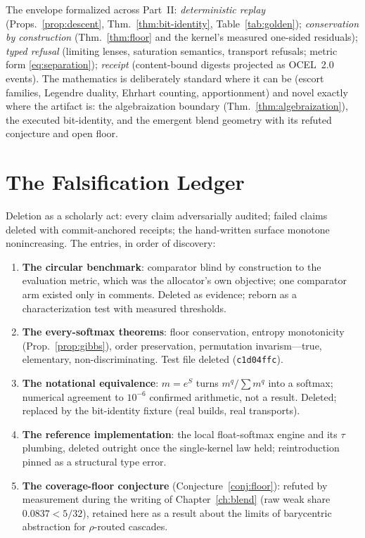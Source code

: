 \documentclass[12pt,oneside]{report}
\theoremstyle{plain}
\theoremstyle{definition}
\theoremstyle{remark}
\newcommand{\commit}[1]{\texttt{#1}}
\begin{document}
The envelope formalized across Part~II: \emph{deterministic replay}
(Props.~\ref{prop:descent}, Thm.~\ref{thm:bit-identity},
Table~\ref{tab:golden}); \emph{conservation by construction}
(Thm.~\ref{thm:floor} and the kernel's measured one-sided residuals);
\emph{typed refusal} (limiting lenses, saturation semantics, transport
refusals; metric form \eqref{eq:separation}); \emph{receipt}
(content-bound digests projected as OCEL~2.0 events). The mathematics
is deliberately standard where it can be (escort families, Legendre
duality, Ehrhart counting, apportionment) and novel exactly where the
artifact is: the algebraization boundary
(Thm.~\ref{thm:algebraization}), the executed bit-identity, and the
emergent blend geometry with its refuted conjecture and open floor.

\chapter{The Falsification Ledger}
\label{ch:ledger}

Deletion as a scholarly act: every claim adversarially audited; failed
claims deleted with commit-anchored receipts; the hand-written surface
monotone nonincreasing. The entries, in order of discovery:

\begin{enumerate}
\item \textbf{The circular benchmark}: comparator blind by
construction to the evaluation metric, which was the allocator's own
objective; one comparator arm existed only in comments. Deleted as
evidence; reborn as a characterization test with measured thresholds.
\item \textbf{The every-softmax theorems}: floor conservation,
entropy monotonicity (Prop.~\ref{prop:gibbs}), order preservation,
permutation invarism---true, elementary, non-discriminating. Test file
deleted (\commit{c1d04ffc}).
\item \textbf{The notational equivalence}: $m=e^S$ turns
$m^q/\sum m^q$ into a softmax; numerical agreement to $10^{-6}$
confirmed arithmetic, not a result. Deleted; replaced by the
bit-identity fixture (real builds, real transports).
\item \textbf{The reference implementation}: the local float-softmax
engine and its $\tau$ plumbing, deleted outright once the single-kernel
law held; reintroduction pinned as a structural type error.
\item \textbf{The coverage-floor conjecture}
(Conjecture~\ref{conj:floor}): refuted by measurement during the
writing of Chapter~\ref{ch:blend} (raw weak share $0.0837<5/32$),
retained here as a result about the limits of barycentric abstraction
for $\rho$-routed cascades.
\end{enumerate}
\end{document}
